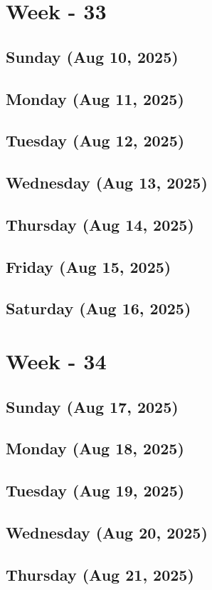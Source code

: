 \section{Week - 33}
\subsection*{Sunday (Aug 10, 2025)}
\subsection*{Monday (Aug 11, 2025)}
\subsection*{Tuesday (Aug 12, 2025)}
\subsection*{Wednesday (Aug 13, 2025)}
\subsection*{Thursday (Aug 14, 2025)}
\subsection*{Friday (Aug 15, 2025)}
\subsection*{Saturday (Aug 16, 2025)}

\section{Week - 34}
\subsection*{Sunday (Aug 17, 2025)}
\subsection*{Monday (Aug 18, 2025)}
\subsection*{Tuesday (Aug 19, 2025)}
\subsection*{Wednesday (Aug 20, 2025)}
\subsection*{Thursday (Aug 21, 2025)}
